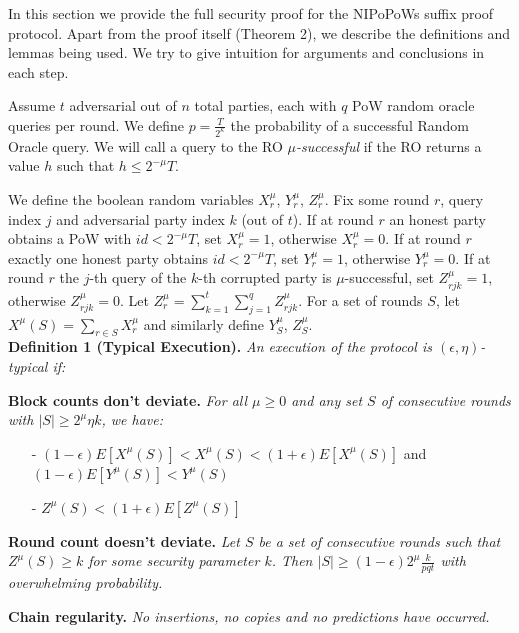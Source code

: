 In this section we provide the full security proof for the NIPoPoWs suffix proof protocol\cite{NIPoPoWs}. Apart from the proof itself (Theorem 2), we describe the definitions and lemmas being used. We try to give intuition for arguments and conclusions in each step.

Assume $t$ adversarial out of $n$ total parties, each with $q$ PoW random oracle queries per round. We define $p = \frac{T}{2^\kappa}$ the probability of a successful Random Oracle query. We will call a query to the RO $\mu$\textit{-successful} if the RO returns a value $h$ such that $h \leq 2^{-\mu}T$.

We define the boolean random variables $X_r^{\mu}$, $Y_r^{\mu}$, $Z_r^{\mu}$. Fix some round $r$, query index $j$ and adversarial party index $k$ (out of $t$). If at round $r$ an honest party obtains a PoW with $id < 2^{-\mu}T$, set $X_r^{\mu} = 1$, otherwise $X_r^{\mu} = 0$. If at round $r$ exactly one honest party obtains $id < 2^{-\mu}T$, set $Y_r^{\mu} = 1$, otherwise $Y_r^{\mu} = 0$. If at round $r$ the $j$-th query of the $k$-th corrupted party is $\mu$-successful, set $Z_{rjk}^{\mu} = 1$, otherwise $Z_{rjk}^{\mu} = 0$. Let $Z_r^{\mu} = \sum_{k=1}^t\sum_{j=1}^qZ_{rjk}^{\mu}$. For a set of rounds $S$, let $X^\mu(S) = \sum_{r \in S}X^{\mu}_r$ and similarly define $Y_S^{\mu}$, $Z_S^{\mu}$.\\

\textbf{Definition 1 (Typical Execution).} \textit{An execution of the protocol is $(\epsilon, \eta)$-typical if:}

\textbf{Block counts don't deviate.} \textit{For all $\mu \geq 0$ and any set $S$ of consecutive rounds with $\vert S \vert \geq 2^\mu \eta k$, we have:}
\begin{itemize}
\item[-] $(1-\epsilon)E[X^\mu(S)] < X^\mu(S) < (1+\epsilon)E[X^\mu(S)] $ and $(1-\epsilon)E[Y^\mu(S)] < Y^\mu(S)$
\item[-] $Z^\mu(S) < (1+\epsilon)E[Z^\mu(S)]$
\end{itemize}

\textbf{Round count doesn't deviate.} \textit{Let $S$ be a set of consecutive rounds such that $Z^\mu(S) \geq k$ for some security parameter $k$. Then $\vert S \vert \geq (1-\epsilon)2^\mu \frac{k}{pqt}$ with overwhelming probability.}

\textbf{Chain regularity.} \textit{No insertions, no copies and no predictions \cite{Backbone} have occurred.}\\

